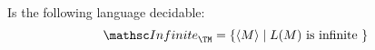 Is the following language decidable:
\[
\INFINITE_\TM = \{ \langle M \rangle \mid L(M) \text{ is infinite } \}
\]
